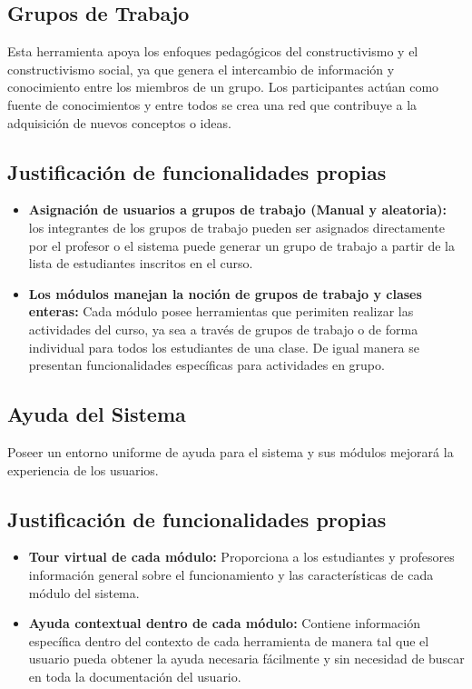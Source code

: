 \subsection{Grupos de Trabajo}

Esta herramienta apoya los enfoques pedagógicos del constructivismo y el constructivismo social, ya que genera el intercambio de información y conocimiento entre los miembros de un grupo. Los participantes actúan como fuente de conocimientos y entre todos se crea una red que contribuye a la adquisición de nuevos conceptos o ideas.

\subsection*{Justificación de funcionalidades propias}

\begin{itemize}

\item \textbf{Asignación de usuarios a grupos de trabajo (Manual y aleatoria):} los integrantes de los grupos de trabajo pueden ser asignados directamente por el profesor o el sistema puede generar un grupo de trabajo a partir de la lista de estudiantes inscritos en el curso.

\item \textbf{Los módulos manejan la noción de grupos de trabajo y clases enteras:} Cada módulo posee herramientas que perimiten realizar las actividades del curso, ya sea a través de grupos de trabajo o de forma individual para todos los estudiantes de una clase. De igual manera se presentan funcionalidades específicas para  actividades en grupo.

\end{itemize}

\subsection{Ayuda del Sistema}
Poseer un entorno uniforme de ayuda para el sistema y sus módulos mejorará la experiencia de los usuarios.

\subsection*{Justificación de funcionalidades propias}

\begin{itemize}

\item \textbf{Tour virtual de cada módulo:} Proporciona a los estudiantes y profesores información general sobre el funcionamiento y las características de cada módulo del sistema.

\item \textbf{Ayuda contextual dentro de cada módulo:} Contiene información específica dentro del contexto de  cada herramienta de manera tal que el usuario pueda obtener la ayuda necesaria fácilmente y sin necesidad de buscar en toda la documentación del usuario.

\end{itemize}

